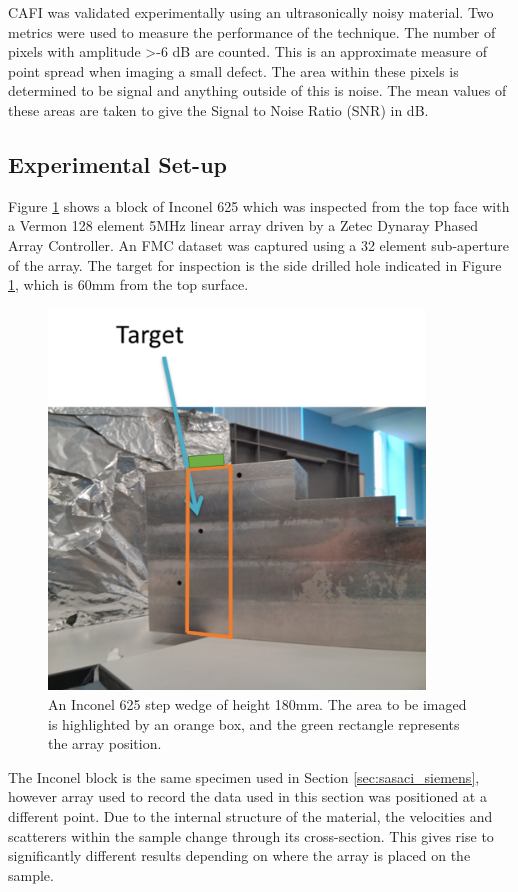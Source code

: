 CAFI was validated experimentally using an ultrasonically noisy material. Two metrics were used to measure the performance of the technique. The number of pixels with amplitude \textgreater -6 dB are counted. This is an approximate measure of point spread when imaging a small defect. The area within these pixels is determined to be signal and anything outside of this is noise. The mean values of these areas are taken to give the Signal to Noise Ratio (SNR) in dB.

\subsection{Experimental Set-up}

Figure \ref{fig:cafi_setup} shows a block of Inconel 625 which was inspected from the top face with a Vermon 128 element 5MHz linear array driven by a Zetec Dynaray Phased Array Controller. An FMC dataset was captured using a 32 element sub-aperture of the array. The target for inspection is the side drilled hole indicated in Figure \ref{fig:cafi_setup}, which is 60mm from the top surface. 

\begin{figure}[hp]
\centering
		\includegraphics[width=100mm]{setup_2.png}
		\caption{An Inconel 625 step wedge of height 180mm. The area to be imaged is highlighted by an orange box, and the green rectangle represents the array position.}
		\label{fig:cafi_setup}
\end{figure}

The Inconel block is the same specimen used in Section \ref{sec:sasaci_siemens}, however array used to record the data used in this section was positioned at a different point. Due to the internal structure of the material, the velocities and scatterers within the sample change through its cross-section. This gives rise to significantly different results depending on where the array is placed on the sample.

